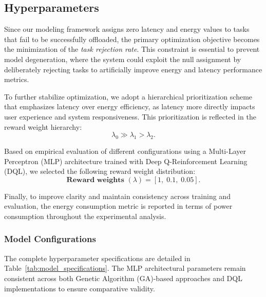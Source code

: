 \documentclass[preprint,3p,authoryear]{elsarticle}
\begin{document}
\subsection{Hyperparameters}

Since our modeling framework assigns zero latency and energy values to tasks that fail to be successfully offloaded, the primary optimization objective becomes the minimization of the \emph{task rejection rate}. This constraint is essential to prevent model degeneration, where the system could exploit the null assignment by deliberately rejecting tasks to artificially improve energy and latency performance metrics.

To further stabilize optimization, we adopt a hierarchical prioritization scheme that emphasizes latency over energy efficiency, as latency more directly impacts user experience and system responsiveness. This prioritization is reflected in the reward weight hierarchy:
\[
\lambda_0 \gg \lambda_1 > \lambda_2.
\]

Based on empirical evaluation of different configurations using a Multi-Layer Perceptron (MLP) architecture trained with Deep Q-Reinforcement Learning (DQL), we selected the following reward weight distribution:
\[
\textbf{Reward weights } (\lambda) = [1,\; 0.1,\; 0.05].
\]

Finally, to improve clarity and maintain consistency across training and evaluation, the energy consumption metric is reported in terms of power consumption throughout the experimental analysis.


\subsubsection{Model Configurations}

The complete hyperparameter specifications are detailed in Table~\ref{tab:model_specifications}. The MLP architectural parameters remain consistent across both Genetic Algorithm (GA)-based approaches and DQL implementations to ensure comparative validity.


\begin{table}[H]
\centering

\caption{Model Specifications}\label{tab:model_specifications}
\end{table}
\end{document}
